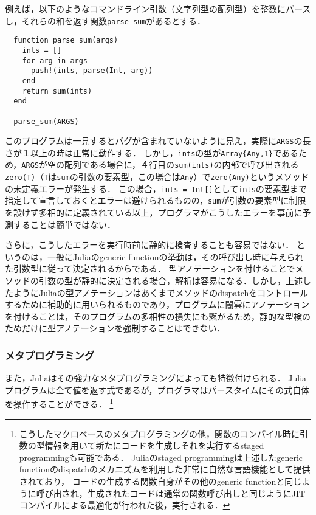 \newpage

例えば，以下のようなコマンドライン引数（文字列型の配列型）を整数にパースし，それらの和を返す関数\texttt{parse\_sum}があるとする．

\begin{verbatim}
  function parse_sum(args)
    ints = []
    for arg in args
      push!(ints, parse(Int, arg))
    end
    return sum(ints)
  end

  parse_sum(ARGS)
\end{verbatim}

このプログラムは一見するとバグが含まれていないように見え，実際に\texttt{ARGS}の長さが１以上の時は正常に動作する．
しかし，\texttt{ints}の型が\texttt{Array\{Any,1\}}であるため，\texttt{ARGS}が空の配列である場合に，４行目の\texttt{sum(ints)}の内部で呼び出される\texttt{zero(T)}（\texttt{T}は\texttt{sum}の引数の要素型，この場合は\texttt{Any}）で\texttt{zero(Any)}というメソッドの未定義エラーが発生する．
この場合，\texttt{ints = Int[]}として\texttt{ints}の要素型まで指定して宣言しておくとエラーは避けられるものの，\texttt{sum}が引数の要素型に制限を設けず多相的に定義されている以上，プログラマがこうしたエラーを事前に予測することは簡単ではない．

さらに，こうしたエラーを実行時前に静的に検査することも容易ではない．
というのは，一般にJuliaのgeneric functionの挙動は，その呼び出し時に与えられた引数型に従って決定されるからである．
型アノテーションを付けることでメソッドの引数の型が静的に決定される場合，解析は容易になる．しかし，上述したようにJuliaの型アノテーションはあくまでメソッドのdispatchをコントロールするために補助的に用いられるものであり，プログラムに闇雲にアノテーションを付けることは，そのプログラムの多相性の損失にも繋がるため，静的な型検のためだけに型アノテーションを強制することはできない．

\subsubsection{メタプログラミング}

また，Juliaはその強力なメタプログラミングによっても特徴付けられる．
Juliaプログラムは全て値を返す式であるが，プログラマはパースタイムにその式自体を操作することができる．
\footnote{
  こうしたマクロベースのメタプログラミングの他，関数のコンパイル時に引数の型情報を用いて新たにコードを生成しそれを実行するstaged programmingも可能である．
  Juliaのstaged programmingは上述したgeneric functionのdispatchのメカニズムを利用した非常に自然な言語機能として提供されており，
  コードの生成する関数自身がその他のgeneric functionと同じように呼び出され，生成されたコードは通常の関数呼び出しと同じようにJITコンパイルによる最適化が行われた後，実行される．
}

